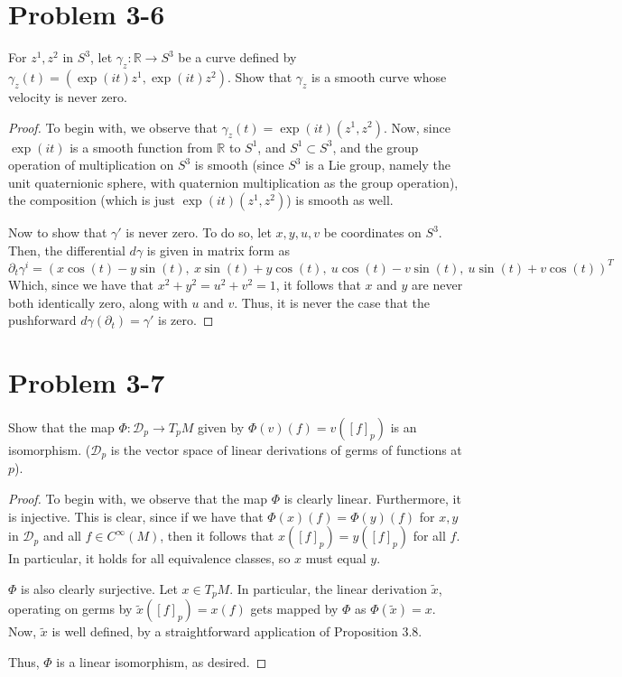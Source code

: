 \documentclass[fontsize=11pt]{scrartcl} %
\numberwithin{equation}{section} %
\numberwithin{figure}{section} %
\numberwithin{table}{section} %
\newcommand{\R}{\mathbb{R}}
\begin{document}
\section*{Problem 3-6}
For $z^1, z^2$ in $S^3$, let $\gamma_z:\R\to S^3$ be a curve defined by
$\gamma_z(t) = (\exp(it)z^1,\exp(it)z^2)$. Show that $\gamma_z$ is a smooth curve whose
velocity is never zero.
\\
\begin{proof}
To begin with, we observe that $\gamma_z(t) = \exp(it)(z^1,z^2)$. Now, since $\exp(it)$ is
a smooth function from $\R$ to $S^1$, and $S^1\subset S^3$, and the group operation
of multiplication on $S^3$ is smooth (since $S^3$ is a Lie group, namely the unit quaternionic
sphere, with quaternion multiplication as the group operation), the composition 
(which is just $\exp(it)(z^1,z^2)$)
is smooth as well.

Now to show that $\gamma'$ is never zero. To do so, let $x,y,u,v$ be coordinates
on $S^3$. Then, the differential $d\gamma$ is given in matrix form as
\[
\partial_t \gamma^i = \left(x\cos(t) - y\sin(t),\ x\sin(t)+y\cos(t),\ u\cos(t) - v\sin(t),\ u\sin(t) + v\cos(t)\right)^T
\]
Which, since we have that $x^2 + y^2 = u^2 + v^2 = 1$, it follows that $x$ and $y$ are
never both identically zero, along with $u$ and $v$. Thus, it is never the 
case that the pushforward $d\gamma(\partial_t) = \gamma'$ is zero.
\end{proof}
\pagebreak
\section*{Problem 3-7}
Show that the map $\Phi:\mathscr{D}_p\to T_pM$ given by $\Phi(v)(f) = v([f]_p)$ is an
isomorphism. ($\mathscr{D}_p$ is the vector space of linear derivations of germs of
functions at $p$).
\\
\begin{proof}
To begin with, we observe that the map $\Phi$ is clearly linear. Furthermore, it is injective. 
This is clear, since
if we have that $\Phi(x)(f)=\Phi(y)(f)$ for $x,y$ in $\mathscr{D}_p$ and all $f\in C^{\infty}(M)$,
then it follows that $x([f]_p) = y([f]_p)$ for all $f$. In particular, it holds for all
equivalence classes, so $x$ must equal $y$.

$\Phi$ is also clearly surjective. Let $x\in T_pM$. In particular, the linear derivation
$\tilde{x}$, operating on germs by $\tilde{x}([f]_p) = x(f)$ gets mapped by $\Phi$
as $\Phi(\tilde{x}) = x$. Now, $\tilde{x}$ is well defined, by a straightforward application
of Proposition 3.8.

Thus, $\Phi$ is a linear isomorphism, as desired.
\end{proof}
\end{document}
